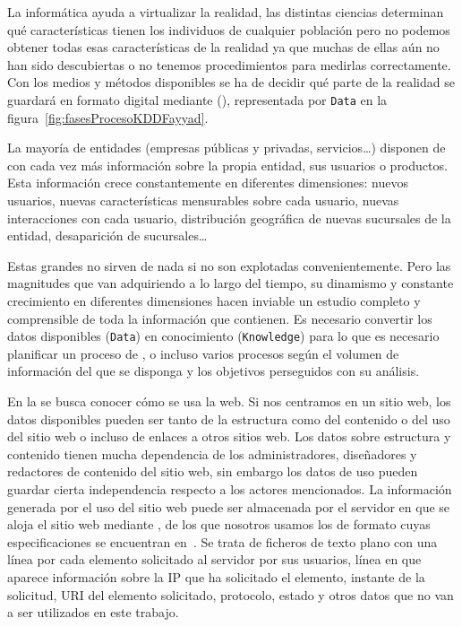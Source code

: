 
La informática ayuda a virtualizar la realidad, las distintas ciencias determinan qué características tienen los individuos de cualquier población pero no podemos obtener todas esas características de la realidad ya que muchas de ellas aún no han sido descubiertas o no tenemos procedimientos para medirlas correctamente. Con los medios y métodos disponibles se ha de decidir qué parte de la realidad se guardará en formato digital mediante \dbs (\DB), representada por \texttt{Data} en la figura~\ref{fig:fasesProcesoKDDFayyad}.

La mayoría de entidades (empresas públicas y privadas, servicios\ldots) disponen de \dbs con cada vez más información sobre la propia entidad, sus usuarios o productos. Esta información crece constantemente en diferentes dimensiones: nuevos usuarios, nuevas características mensurables sobre cada usuario, nuevas interacciones con cada usuario, distribución geográfica de nuevas sucursales de la entidad, desaparición de sucursales\ldots

Estas grandes \dbs no sirven de nada si no son explotadas convenientemente. Pero las magnitudes que van adquiriendo a lo largo del tiempo, su dinamismo y constante crecimiento en diferentes dimensiones hacen inviable un estudio completo y comprensible de toda la información que contienen. Es necesario convertir los datos disponibles (\texttt{Data}) en conocimiento (\texttt{Knowledge}) para lo que es necesario planificar un proceso de \KDD, o incluso varios procesos según el volumen de información del que se disponga y los objetivos perseguidos con su análisis.

En la \wum se busca conocer cómo se usa la web. Si nos centramos en un sitio web, los datos disponibles pueden ser tanto de la estructura como del contenido o del uso del sitio web o incluso de enlaces a otros sitios web. Los datos sobre estructura y contenido tienen mucha dependencia de los administradores, diseñadores y redactores de contenido del sitio web, sin embargo los datos de uso pueden guardar cierta independencia respecto a los actores mencionados. La información generada por el uso del sitio web puede ser almacenada por el servidor en que se aloja el sitio web mediante \flogs, de los que nosotros usamos los de formato \ELogFF cuyas especificaciones se encuentran en~\citet{W3Clogfile}. Se trata de ficheros de texto plano con una línea por cada elemento solicitado al servidor por sus usuarios, línea en que aparece información sobre la IP que ha solicitado el elemento, instante de la solicitud, URI del elemento solicitado, protocolo, estado y otros datos que no van a ser utilizados en este trabajo.

